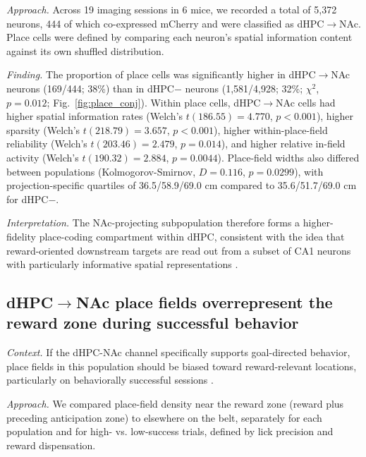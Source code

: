 \documentclass[11pt]{article}
\begin{document}
\textit{Approach.} Across 19 imaging sessions in 6 mice, we recorded a total of 5{,}372 neurons, 444 of which co-expressed mCherry and were classified as dHPC$\rightarrow$NAc. Place cells were defined by comparing each neuron's spatial information content against its own shuffled distribution.

\textit{Finding.} The proportion of place cells was significantly higher in dHPC$\rightarrow$NAc neurons (169/444; 38\%) than in dHPC$-$ neurons (1{,}581/4{,}928; 32\%; $\chi^2$, $p=0.012$; Fig.~\ref{fig:place_conj}). Within place cells, dHPC$\rightarrow$NAc cells had higher spatial information rates (Welch's $t(186.55)=4.770$, $p<0.001$), higher sparsity (Welch's $t(218.79)=3.657$, $p<0.001$), higher within-place-field reliability (Welch's $t(203.46)=2.479$, $p=0.014$), and higher relative in-field activity (Welch's $t(190.32)=2.884$, $p=0.0044$). Place-field widths also differed between populations (Kolmogorov-Smirnov, $D=0.116$, $p=0.0299$), with projection-specific quartiles of 36.5/58.9/69.0 cm compared to 35.6/51.7/69.0 cm for dHPC$-$.

\textit{Interpretation.} The NAc-projecting subpopulation therefore forms a higher-fidelity place-coding compartment within dHPC, consistent with the idea that reward-oriented downstream targets are read out from a subset of CA1 neurons with particularly informative spatial representations \citep{Xiao2020Conjunctive,Ciocchi2015Selective}.

\subsection{dHPC$\rightarrow$NAc place fields overrepresent the reward zone during successful behavior}

\textit{Context.} If the dHPC-NAc channel specifically supports goal-directed behavior, place fields in this population should be biased toward reward-relevant locations, particularly on behaviorally successful sessions \citep{Hok2007Goal,Gauthier2018Reward,Sosa2018Reward,Sato2020Overrepresentation}.

\textit{Approach.} We compared place-field density near the reward zone (reward plus preceding anticipation zone) to elsewhere on the belt, separately for each population and for high- vs. low-success trials, defined by lick precision and reward dispensation.
\end{document}
